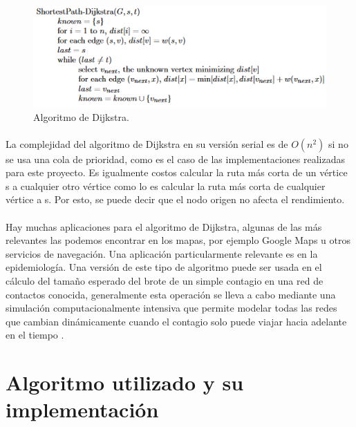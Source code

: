 \documentclass[11pt]{article}
\begin{document}
\begin{figure}
\includegraphics[width=0.9\linewidth]{algoritmo.png}
  \caption{Algoritmo de Dijkstra.}
\end{figure}

\paragraph{}
La complejidad del algoritmo de Dijkstra en su versión serial es de $O(n^2)$ si no se usa una cola de prioridad, como es el caso de las implementaciones realizadas para este proyecto. Es igualmente costos calcular la ruta más corta de un vértice s a cualquier otro vértice como lo es calcular la ruta más corta de cualquier vértice a s. Por esto, se puede decir que el nodo origen no afecta el rendimiento. 

\paragraph{}
Hay muchas aplicaciones para el algoritmo de Dijkstra, algunas de las más relevantes las podemos encontrar en los mapas, por ejemplo Google Maps u otros servicios de navegación. Una aplicación particularmente relevante es en la epidemiología. Una versión de este tipo de algoritmo puede ser usada en el cálculo del tamaño esperado del brote de un simple contagio en una red de contactos conocida, generalmente esta operación se lleva a cabo mediante una simulación computacionalmente intensiva que permite modelar todas las redes que cambian dinámicamente cuando el contagio solo puede viajar hacia adelante en el tiempo .



\section{Algoritmo utilizado y su implementación }
\end{document}
